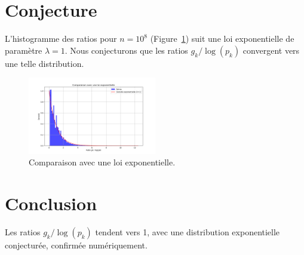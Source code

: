 \documentclass[a4paper,12pt]{article}
\begin{document}
	\section{Conjecture}
	L'histogramme des ratios pour \( n = 10^8 \) (Figure~\ref{fig:exp}) suit une loi exponentielle de paramètre \( \lambda = 1 \). Nous conjecturons que les ratios \( g_k / \log(p_k) \) convergent vers une telle distribution.
	
	\begin{figure}[h]
		\centering
		\includegraphics[width=0.5\textwidth]{exponential_comparison.png}
		\caption{Comparaison avec une loi exponentielle.}
		\label{fig:exp}
	\end{figure}
	
	\section{Conclusion}
	Les ratios \( g_k / \log(p_k) \) tendent vers 1, avec une distribution exponentielle conjecturée, confirmée numériquement.
	
\end{document}
